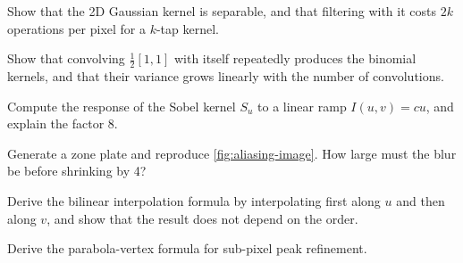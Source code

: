 \begin{exercises}
  \item Show that the 2D Gaussian kernel is separable, and that filtering with it costs $2k$ operations per pixel for a $k$-tap kernel.
  \item Show that convolving $\tfrac12[1, 1]$ with itself repeatedly produces the binomial kernels, and that their variance grows linearly with the number of
        convolutions.
  \item Compute the response of the Sobel kernel $S_u$ to a linear ramp $I(u, v) = cu$, and explain the factor 8.
  \item Generate a zone plate and reproduce \cref{fig:aliasing-image}. How large must the blur be before shrinking by 4?
  \item Derive the bilinear interpolation formula by interpolating first along $u$ and then along $v$, and show that the result does not depend on the order.
  \item Derive the parabola-vertex formula for sub-pixel peak refinement.
\end{exercises}

